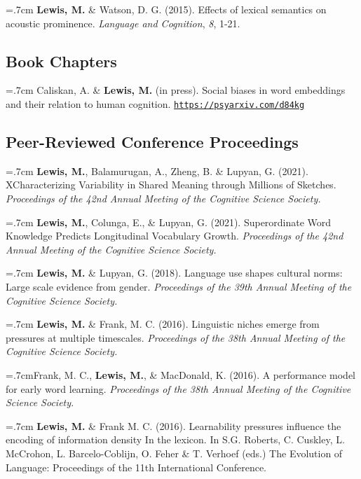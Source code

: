 \documentclass[letterpaper]{article}
\begin{document}
  \hangindent=.7cm {\bf Lewis, M.} \& Watson, D. G. (2015). Effects of lexical semantics on acoustic prominence. { \it Language and Cognition}, {\it 8}, 1-21.
  
  \subsection*{Book Chapters}

\onehalfspacing



\hangindent=.7cm Caliskan, A. \& {\bf Lewis, M.} (in press). Social biases in word embeddings and their relation to human cognition. \href{hhttps://psyarxiv.com/d84kg}{\tt https://psyarxiv.com/d84kg}

  \subsection*{Peer-Reviewed Conference Proceedings}
  
      \hangindent=.7cm {\bf Lewis, M.},  Balamurugan, A., Zheng, B. \& Lupyan, G. (2021). XCharacterizing Variability in Shared Meaning through Millions of Sketches.   { \it Proceedings of the 42nd Annual Meeting of the Cognitive Science Society.}
      
 \hangindent=.7cm {\bf Lewis, M.}, Colunga, E., \& Lupyan, G. (2021).  Superordinate Word Knowledge Predicts Longitudinal Vocabulary Growth.  { \it Proceedings of the 42nd Annual Meeting of the Cognitive Science Society.}
          

    \hangindent=.7cm {\bf Lewis, M.} \& Lupyan, G. (2018). Language use shapes cultural norms: Large scale evidence from gender.  { \it Proceedings of the 39th Annual Meeting of the Cognitive Science Society.}

  \hangindent=.7cm {\bf Lewis, M.} \& Frank, M. C. (2016). Linguistic niches emerge from pressures at multiple timescales. { \it Proceedings of the 38th Annual Meeting of the Cognitive Science Society.}

   \hangindent=.7cmFrank, M. C.,  {\bf Lewis, M.}, \& MacDonald, K. (2016). A performance model for early word learning.  { \it Proceedings of the 38th Annual Meeting of the Cognitive Science Society.}

  \hangindent=.7cm {\bf Lewis, M.} \& Frank M. C. (2016). Learnability pressures influence the encoding of information density In the lexicon. In S.G. Roberts, C. Cuskley, L. McCrohon, L. Barcelo-Coblijn, O. Feher \& T. Verhoef (eds.) The Evolution of Language: Proceedings of the 11th International Conference.
\end{document}
